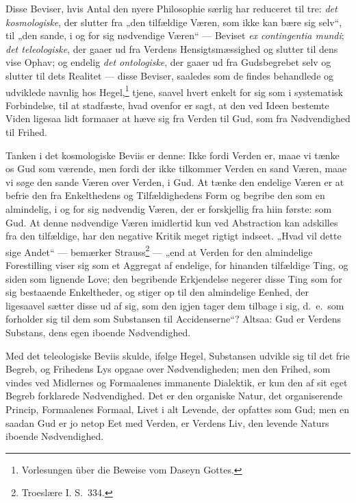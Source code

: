 \documentclass[12pt]{book}
\begin{document}
Disse Beviser, hvis Antal den nyere Philosophie særlig har
reduceret til tre: \emph{det kosmologiske}, der slutter fra „den
tilfældige Væren, som ikke kan bære sig selv“, til „den sande, i og
for sig nødvendige Væren“ --- Beviset \textit{ex contingentia
mundi}; \emph{det teleologiske}, der gaaer ud fra Verdens
Hensigtsmæssighed og slutter til dens vise Ophav; og endelig
\emph{det ontologiske}, der gaaer ud fra Gudsbegrebet selv og
slutter til dets Realitet --- disse Beviser, saaledes som de findes
behandlede og udviklede navnlig hos Hegel,\footnote{Vorlesungen über
die Beweise vom Daseyn Gottes.} tjene, saavel hvert enkelt for sig
som i systematisk Forbindelse, til at stadfæste, hvad ovenfor er
sagt, at den ved Ideen bestemte
Viden ligesaa lidt formaaer at hæve sig fra Verden til Gud, som fra
Nødvendighed til Frihed.

Tanken i det kosmologiske Beviis er denne: Ikke fordi Verden er,
maae vi tænke os Gud som værende, men fordi der ikke tilkommer
Verden en sand Væren, maae vi søge den sande Væren over Verden, i
Gud. At tænke den endelige Væren er at befrie den fra Enkelthedens
og Tilfældighedens Form og begribe den som en almindelig, i og for
sig nødvendig Væren, der er forskjellig fra hiin første: som Gud. At
denne nødvendige Væren imidlertid kun ved Abstraction kan adskilles
fra den tilfældige, har den negative Kritik meget rigtigt indseet.
„Hvad vil dette sige Andet“ --- bemærker Strauss\footnote{Troeslære
I. S.\ 334.} --- „end at Verden for den almindelige Forestilling
viser sig som et Aggregat af endelige, for hinanden tilfældige Ting,
og siden som lignende Love; den begribende Erkjendelse negerer disse
Ting som for sig bestaaende Enkeltheder, og stiger op til den
almindelige Eenhed, der ligesaavel sætter disse ud af sig, som den
igjen tager dem tilbage i sig, d.\ e.\ som forholder sig til dem som
Substansen til Accidenserne“? Altsaa: Gud er Verdens Substans, dens
egen iboende Nødvendighed.

Med det teleologiske Beviis skulde, ifølge Hegel, Substansen udvikle
sig til det frie Begreb, og Frihedens Lys opgaae over
Nødvendigheden; men den Frihed, som vindes ved Midlernes og
Formaalenes immanente Dialektik, er kun den af sit eget Begreb
forklarede Nødvendighed. Det er den organiske Natur, det
organiserende Princip, Formaalenes Formaal, Livet i alt Levende, der
opfattes som Gud; men en saadan Gud er jo netop Eet med Verden, er
Verdens Liv, den levende Naturs iboende Nødvendighed.
\end{document}
